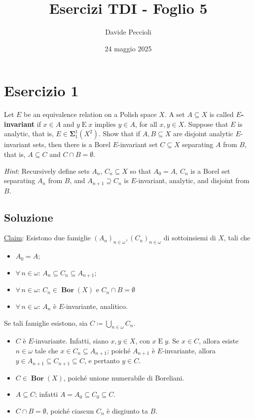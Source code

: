 \documentclass{article}
\author{Davide Peccioli}
\date{24 maggio 2025}
\title{Esercizi TDI - Foglio 5}
\newcommand{\1}{\mathds{1}}
\begin{document}
\maketitle
\section{Esercizio 1}
\label{sec:org46ec7ec}

Let \(E\) be an equivalence relation on a Polish space \(X\). A set \(A \subseteq X\) is called \textbf{\(E\)-invariant} if \(x \in A\) and \(y \mathrel{E} x\) implies \(y \in A\), for all \(x, y \in X\). Suppose that \(E\) is analytic, that is, \(E \in \bm{\Sigma}^1_1(X^2)\). Show that if \(A, B \subseteq X\) are disjoint analytic \(E\)-invariant sets, then there is a Borel \(E\)-invariant set \(C \subseteq X\) separating \(A\) from \(B\), that is, \(A \subseteq C\) and \(C \cap B = \emptyset\).

\emph{Hint}: Recursively define sets \(A_n\), \(C_n \subseteq X\) so that \(A_0 = A\), \(C_n\) is a Borel set separating \(A_n\) from \(B\), and \(A_{n+1} \supseteq C_n\) is \(E\)-invariant, analytic, and disjoint from \(B\).
\subsection{Soluzione}
\label{sec:org437d64a}

\uline{Claim}: Esistono due famiglie \((A_{n})_{n \in \omega}, (C_{n})_{n \in \omega}\) di sottoinsiemi di \(X\), tali che
\begin{itemize}
\item \(A_{0}=A\);
\item \(\forall\, n \in\omega\): \(A_{n} \subseteq C_{n} \subseteq A_{n+1}\);
\item \(\forall\, n \in\omega\): \(C_{n} \in \bm{{\operatorname{Bor}}}(X)\) e \(C_{n}\cap B = \emptyset\)
\item \(\forall\, n \in \omega\): \(A_{n}\) è \(E\)-invariante, analitico.
\end{itemize}

Se tali famiglie esistono, sia \(C\coloneqq\bigcup_{n \in\omega} C_{n}\).
\begin{itemize}
\item \(C\) è \(E\)-invariante. Infatti, siano \(x,y \in X\), con  \(x\mathrel{E}y\). Se \(x \in C\), allora esiste \(n \in\omega\) tale che \(x \in C_{n} \subseteq A_{n+1}\); poiché \(A_{n+1}\) è \(E\)-invariante, allora \(y \in A_{n+1} \subseteq C_{n+1} \subseteq C\), e pertanto \(y \in C\).
\item \(C \in \bm{{\operatorname{Bor}}}(X)\), poiché unione numerabile di Boreliani.
\item \(A \subseteq C\); infatti \(A = A_{0} \subseteq C_{0} \subseteq C\).
\item \(C\cap B = \emptyset\), poiché ciascun \(C_{n}\) è disgiunto ta \(B\).
\end{itemize}
\end{document}
